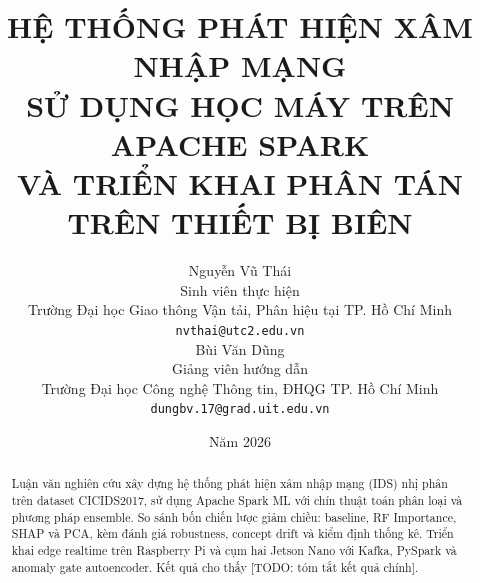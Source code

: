 \documentclass[12pt,a4paper]{report}
\title{%
  HỆ THỐNG PHÁT HIỆN XÂM NHẬP MẠNG\\
  SỬ DỤNG HỌC MÁY TRÊN APACHE SPARK\\
  VÀ TRIỂN KHAI PHÂN TÁN TRÊN THIẾT BỊ BIÊN
}
\author{%
  \begin{tabular}[t]{c}
    Nguyễn Vũ Thái\\[0.4em]
    {\small Sinh viên thực hiện}\\[0.2em]
    {\small Trường Đại học Giao thông Vận tải, Phân hiệu tại TP. Hồ Chí Minh}\\[0.2em]
    {\small \texttt{nvthai@utc2.edu.vn}}\\[1.2em]
    Bùi Văn Dũng\\[0.4em]
    {\small Giảng viên hướng dẫn}\\[0.2em]
    {\small Trường Đại học Công nghệ Thông tin, ĐHQG TP. Hồ Chí Minh}\\[0.2em]
    {\small \texttt{dungbv.17@grad.uit.edu.vn}}
  \end{tabular}%
}
\date{Năm 2026}
\begin{document}
\maketitle

\begin{abstract}
Luận văn nghiên cứu xây dựng hệ thống phát hiện xâm nhập mạng (IDS) nhị phân trên dataset CICIDS2017,
sử dụng Apache Spark ML với chín thuật toán phân loại và phương pháp ensemble.
So sánh bốn chiến lược giảm chiều: baseline, RF Importance, SHAP và PCA,
kèm đánh giá robustness, concept drift và kiểm định thống kê.
Triển khai edge realtime trên Raspberry Pi và cụm hai Jetson Nano với Kafka, PySpark và anomaly gate autoencoder.
Kết quả cho thấy [TODO: tóm tắt kết quả chính].
\end{abstract}

\tableofcontents
\listoffigures
\listoftables










\end{document}

